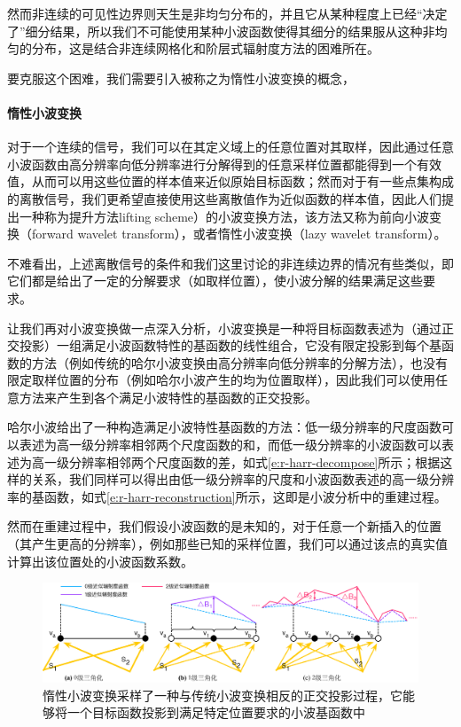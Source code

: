 然而非连续的可见性边界则天生是非均匀分布的，并且它从某种程度上已经“决定了”细分结果，所以我们不可能使用某种小波函数使得其细分的结果服从这种非均匀的分布，这是结合非连续网格化和阶层式辐射度方法的困难所在。

要克服这个困难，我们需要引入被称之为惰性小波变换的概念，




\paragraph{惰性小波变换}
对于一个连续的信号，我们可以在其定义域上的任意位置对其取样，因此通过任意小波函数由高分辨率向低分辨率进行分解得到的任意采样位置都能得到一个有效值，从而可以用这些位置的样本值来近似原始目标函数；然而对于有一些点集构成的离散信号，我们更希望直接使用这些离散值作为近似函数的样本值，因此人们提出一种称为提升方法lifting scheme）的小波变换方法，该方法又称为前向小波变换（forward wavelet transform），或者惰性小波变换（lazy wavelet transform）。

不难看出，上述离散信号的条件和我们这里讨论的非连续边界的情况有些类似，即它们都是给出了一定的分解要求（如取样位置），使小波分解的结果满足这些要求。

让我们再对小波变换做一点深入分析，小波变换是一种将目标函数表述为（通过正交投影）一组满足小波函数特性的基函数的线性组合，它没有限定投影到每个基函数的方法（例如传统的哈尔小波变换由高分辨率向低分辨率的分解方法），也没有限定取样位置的分布（例如哈尔小波产生的均为位置取样），因此我们可以使用任意方法来产生到各个满足小波特性的基函数的正交投影。

哈尔小波给出了一种构造满足小波特性基函数的方法：低一级分辨率的尺度函数可以表述为高一级分辨率相邻两个尺度函数的和，而低一级分辨率的小波函数可以表述为高一级分辨率相邻两个尺度函数的差，如式\ref{e:r-harr-decompose}所示；根据这样的关系，我们同样可以得出由低一级分辨率的尺度和小波函数表述的高一级分辨率的基函数，如式\ref{e:r-harr-reconstruction}所示，这即是小波分析中的重建过程。

然而在重建过程中，我们假设小波函数的是未知的，对于任意一个新插入的位置（其产生更高的分辨率），例如那些已知的采样位置，我们可以通过该点的真实值计算出该位置处的小波函数系数。

\begin{figure}
\begin{fullwidth}
	\includegraphics[width=\thewidth]{figures/r/triangulation}
	\caption{惰性小波变换采样了一种与传统小波变换相反的正交投影过程，它能够将一个目标函数投影到满足特定位置要求的小波基函数中}
	\label{f:r-triangulation}
\end{fullwidth}
\end{figure}

